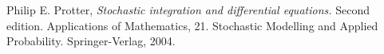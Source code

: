 \documentclass[12pt]{article}
\begin{document}
\begin{thebibliography}{9}
Philip E. Protter, \emph{Stochastic integration and differential equations.} Second edition. Applications of Mathematics, 21. Stochastic Modelling and Applied Probability. Springer-Verlag, 2004.
\end{thebibliography}

\end{document}
